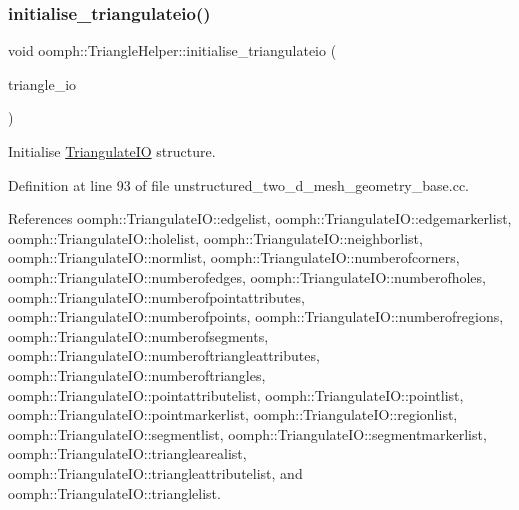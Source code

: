 \mbox{\label{namespaceoomph_1_1TriangleHelper_a884345fd8d03dda0fa3499d2c63a4f5c}} 
\subsubsection{\texorpdfstring{initialise\+\_\+triangulateio()}{initialise\_triangulateio()}}
{\footnotesize\ttfamily void oomph\+::\+Triangle\+Helper\+::initialise\+\_\+triangulateio (\begin{DoxyParamCaption}\item[{\hyperlink{structoomph_1_1TriangulateIO}{Triangulate\+IO} \&}]{triangle\+\_\+io }\end{DoxyParamCaption})}



Initialise \hyperlink{structoomph_1_1TriangulateIO}{Triangulate\+IO} structure. 



Definition at line 93 of file unstructured\+\_\+two\+\_\+d\+\_\+mesh\+\_\+geometry\+\_\+base.\+cc.



References oomph\+::\+Triangulate\+I\+O\+::edgelist, oomph\+::\+Triangulate\+I\+O\+::edgemarkerlist, oomph\+::\+Triangulate\+I\+O\+::holelist, oomph\+::\+Triangulate\+I\+O\+::neighborlist, oomph\+::\+Triangulate\+I\+O\+::normlist, oomph\+::\+Triangulate\+I\+O\+::numberofcorners, oomph\+::\+Triangulate\+I\+O\+::numberofedges, oomph\+::\+Triangulate\+I\+O\+::numberofholes, oomph\+::\+Triangulate\+I\+O\+::numberofpointattributes, oomph\+::\+Triangulate\+I\+O\+::numberofpoints, oomph\+::\+Triangulate\+I\+O\+::numberofregions, oomph\+::\+Triangulate\+I\+O\+::numberofsegments, oomph\+::\+Triangulate\+I\+O\+::numberoftriangleattributes, oomph\+::\+Triangulate\+I\+O\+::numberoftriangles, oomph\+::\+Triangulate\+I\+O\+::pointattributelist, oomph\+::\+Triangulate\+I\+O\+::pointlist, oomph\+::\+Triangulate\+I\+O\+::pointmarkerlist, oomph\+::\+Triangulate\+I\+O\+::regionlist, oomph\+::\+Triangulate\+I\+O\+::segmentlist, oomph\+::\+Triangulate\+I\+O\+::segmentmarkerlist, oomph\+::\+Triangulate\+I\+O\+::trianglearealist, oomph\+::\+Triangulate\+I\+O\+::triangleattributelist, and oomph\+::\+Triangulate\+I\+O\+::trianglelist.




